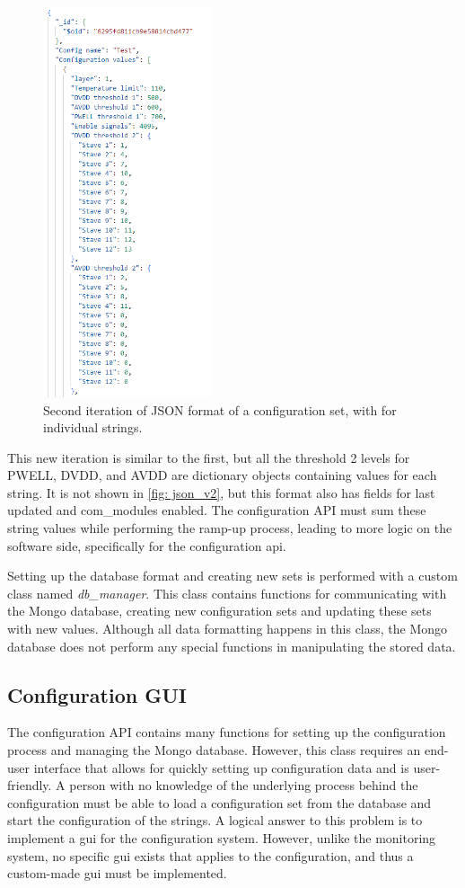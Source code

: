 \documentclass[main.tex]{subfiles}
\begin{document}
\begin{figure}[!ht]
    \centering
    \includegraphics[width=5cm, scale=1]{images/JSON_example_v2.png}
    \caption{Second iteration of JSON format of a configuration set, with for individual strings.}
    \label{fig: json_v2}
\end{figure}
\FloatBarrier

This new iteration is similar to the first, but all the threshold 2 levels for PWELL, DVDD, and AVDD are dictionary objects containing values for each string. It is not shown in \autoref{fig: json_v2}, but this format also has fields for last updated and com\_modules enabled. The configuration API must sum these string values while performing the ramp-up process, leading to more logic on the software side, specifically for the configuration \gls{api}.

Setting up the database format and creating new sets is performed with a custom class named \textit{db\_manager}. This class contains functions for communicating with the Mongo database, creating new configuration sets and updating these sets with new values. Although all data formatting happens in this class, the Mongo database does not perform any special functions in manipulating the stored data.



\subsection{Configuration GUI}  
\label{ssec: cgui}
The configuration API contains many functions for setting up the configuration process and managing the Mongo database. However, this class requires an end-user interface that allows for quickly setting up configuration data and is user-friendly. A person with no knowledge of the underlying process behind the configuration must be able to load a configuration set from the database and start the configuration of the strings. A logical answer to this problem is to implement a \gls{gui} for the configuration system. However, unlike the monitoring system, no specific \gls{gui} exists that applies to the configuration, and thus a custom-made \gls{gui} must be implemented.
\end{document}
